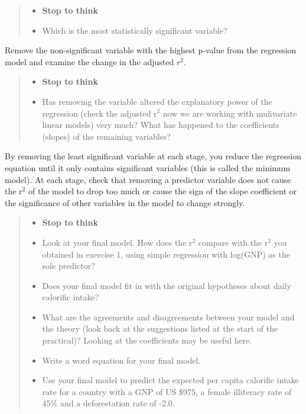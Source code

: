 \documentclass[
]{book}
\providecommand{\tightlist}{%
  \setlength{\itemsep}{0pt}\setlength{\parskip}{0pt}}
\begin{document}
\begin{quote}
\begin{itemize}
\tightlist
\item
  \textbf{Stop to think}\\
\item
  Which is the most statistically significant variable?
\end{itemize}
\end{quote}

Remove the non-significant variable with the highest p-value from the regression model and examine the change in the adjusted \(r^2\).

\begin{quote}
\begin{itemize}
\tightlist
\item
  \textbf{Stop to think}
\item
  Has removing the variable altered the explanatory power of the regression (check the adjusted r\(^2\) now we are working with mulivariate linear models) very much? What has happened to the coefficients (slopes) of the remaining variables?
\end{itemize}
\end{quote}

By removing the least significant variable at each stage, you reduce the regression equation until it only contains significant variables (this is called the minimum model). At each stage, check that removing a predictor variable does not cause the r\(^2\) of the model to drop too much or cause the sign of the slope coefficient or the significance of other variables in the model to change strongly.

\begin{quote}
\begin{itemize}
\tightlist
\item
  \textbf{Stop to think}\\
\item
  Look at your final model. How does the r\(^2\) compare with the r\(^2\) you obtained in exercise 1, using simple regression with log(GNP) as the sole predictor?
\item
  Does your final model fit in with the original hypotheses about daily calorific intake?
\item
  What are the agreements and disagreements between your model and the theory (look back at the suggestions listed at the start of the practical)? Looking at the coefficients may be useful here.
\item
  Write a word equation for your final model.
\item
  Use your final model to predict the expected per capita calorific intake rate for a country with a GNP of US \$975, a female illiteracy rate of 45\% and a deforestation rate of -2.0.
\end{itemize}
\end{quote}
\end{document}
